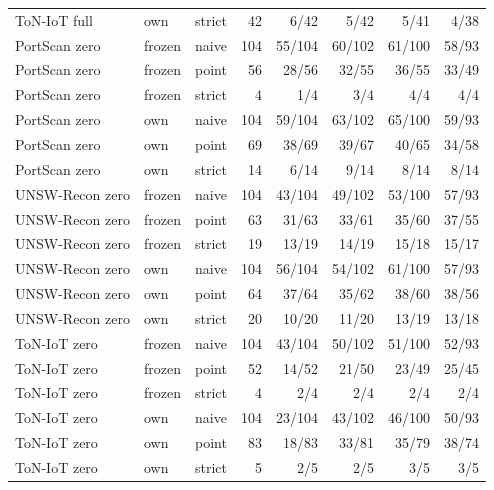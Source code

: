 \begin{table}
\begin{tabular}{l l l r r r r r}
ToN-IoT full & own & strict & 42 & 6/42 & 5/42 & 5/41 & 4/38 \\
\addlinespace
PortScan zero & frozen & naive & 104 & 55/104 & 60/102 & 61/100 & 58/93 \\
PortScan zero & frozen & point & 56 & 28/56 & 32/55 & 36/55 & 33/49 \\
PortScan zero & frozen & strict & 4 & 1/4 & 3/4 & 4/4 & 4/4 \\
PortScan zero & own & naive & 104 & 59/104 & 63/102 & 65/100 & 59/93 \\
PortScan zero & own & point & 69 & 38/69 & 39/67 & 40/65 & 34/58 \\
PortScan zero & own & strict & 14 & 6/14 & 9/14 & 8/14 & 8/14 \\
\addlinespace
UNSW-Recon zero & frozen & naive & 104 & 43/104 & 49/102 & 53/100 & 57/93 \\
UNSW-Recon zero & frozen & point & 63 & 31/63 & 33/61 & 35/60 & 37/55 \\
UNSW-Recon zero & frozen & strict & 19 & 13/19 & 14/19 & 15/18 & 15/17 \\
UNSW-Recon zero & own & naive & 104 & 56/104 & 54/102 & 61/100 & 57/93 \\
UNSW-Recon zero & own & point & 64 & 37/64 & 35/62 & 38/60 & 38/56 \\
UNSW-Recon zero & own & strict & 20 & 10/20 & 11/20 & 13/19 & 13/18 \\
\addlinespace
ToN-IoT zero & frozen & naive & 104 & 43/104 & 50/102 & 51/100 & 52/93 \\
ToN-IoT zero & frozen & point & 52 & 14/52 & 21/50 & 23/49 & 25/45 \\
ToN-IoT zero & frozen & strict & 4 & 2/4 & 2/4 & 2/4 & 2/4 \\
ToN-IoT zero & own & naive & 104 & 23/104 & 43/102 & 46/100 & 50/93 \\
ToN-IoT zero & own & point & 83 & 18/83 & 33/81 & 35/79 & 38/74 \\
ToN-IoT zero & own & strict & 5 & 2/5 & 2/5 & 3/5 & 3/5 \\
\bottomrule
\end{tabular}
\end{table}
